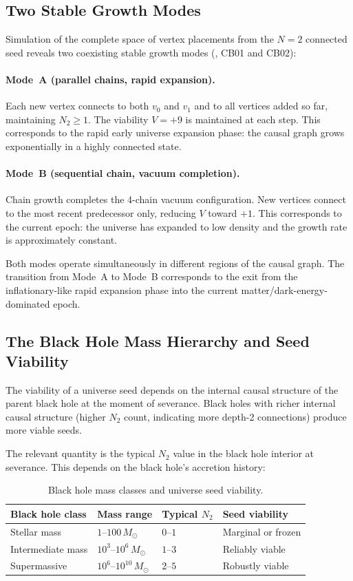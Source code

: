 \documentclass[12pt,a4paper]{article}
\begin{document}
\subsection{Two Stable Growth Modes}

Simulation of the complete space of vertex placements from the $N=2$ connected seed reveals two coexisting stable growth modes (\statusDR, CB01 and CB02):

\paragraph{Mode~A (parallel chains, rapid expansion).}  Each new vertex connects to both $v_0$ and $v_1$ and to all vertices added so far, maintaining $N_2\geq1$.  The viability $V=+9$ is maintained at each step.  This corresponds to the rapid early universe expansion phase: the causal graph grows exponentially in a highly connected state.

\paragraph{Mode~B (sequential chain, vacuum completion).}  Chain growth completes the 4-chain vacuum configuration.  New vertices connect to the most recent predecessor only, reducing $V$ toward $+1$.  This corresponds to the current epoch: the universe has expanded to low density and the growth rate is approximately constant.

Both modes operate simultaneously in different regions of the causal graph.  The transition from Mode~A to Mode~B corresponds to the exit from the inflationary-like rapid expansion phase into the current matter/dark-energy-dominated epoch.

\subsection{The Black Hole Mass Hierarchy and Seed Viability}

The viability of a universe seed depends on the internal causal structure of the parent black hole at the moment of severance.  Black holes with richer internal causal structure (higher $N_2$ count, indicating more depth-2 connections) produce more viable seeds.

The relevant quantity is the typical $N_2$ value in the black hole interior at severance.  This depends on the black hole's accretion history:

\begin{table}[ht]
\centering
\caption{Black hole mass classes and universe seed viability.}
\label{tab:BH_hierarchy}
\begin{tabular}{p{3.5cm}p{2cm}p{2.5cm}l}
\toprule
Black hole class & Mass range & Typical $N_2$ & Seed viability \\
\midrule
Stellar mass & $1$--$100\,M_\odot$ & $0$--$1$ & Marginal or frozen \\
Intermediate mass & $10^3$--$10^6\,M_\odot$ & $1$--$3$ & Reliably viable \\
Supermassive & $10^6$--$10^{10}\,M_\odot$ & $2$--$5$ & Robustly viable \\
\bottomrule
\end{tabular}
\end{table}
\end{document}
